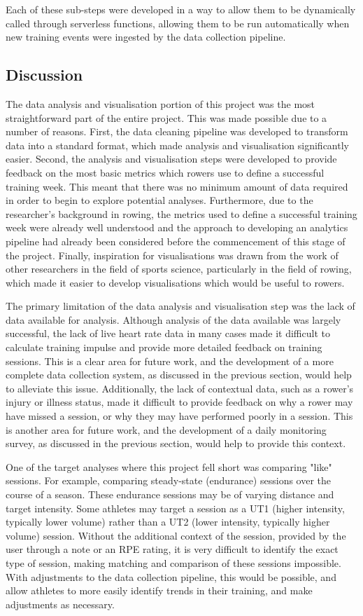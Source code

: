 Each of these sub-steps were developed in a way to allow them to be dynamically called through serverless functions, allowing them to be run automatically when new training events were ingested by the data collection pipeline.

\subsection{Discussion}
The data analysis and visualisation portion of this project was the most straightforward part of the entire project. This was made possible due to a number of reasons. First, the data cleaning pipeline was developed to transform data into a standard format, which made analysis and visualisation significantly easier. Second, the analysis and visualisation steps were developed to provide feedback on the most basic metrics which rowers use to define a successful training week. This meant that there was no minimum amount of data required in order to begin to explore potential analyses. Furthermore, due to the researcher's background in rowing, the metrics used to define a successful training week were already well understood and the approach to developing an analytics pipeline had already been considered before the commencement of this stage of the project. Finally, inspiration for visualisations was drawn from the work of other researchers in the field of sports science, particularly in the field of rowing, which made it easier to develop visualisations which would be useful to rowers.

The primary limitation of the data analysis and visualisation step was the lack of data available for analysis. Although analysis of the data available was largely successful, the lack of live heart rate data in many cases made it difficult to calculate training impulse and provide more detailed feedback on training sessions. This is a clear area for future work, and the development of a more complete data collection system, as discussed in the previous section, would help to alleviate this issue. Additionally, the lack of contextual data, such as a rower's injury or illness status, made it difficult to provide feedback on why a rower may have missed a session, or why they may have performed poorly in a session. This is another area for future work, and the development of a daily monitoring survey, as discussed in the previous section, would help to provide this context. 

One of the target analyses where this project fell short was comparing "like" sessions. For example, comparing steady-state (endurance) sessions over the course of a season. These endurance sessions may be of varying distance and target intensity. Some athletes may target a session as a UT1 (higher intensity, typically lower volume) rather than a UT2 (lower intensity, typically higher volume) session. Without the additional context of the session, provided by the user through a note or an RPE rating, it is very difficult to identify the exact type of session, making matching and comparison of these sessions impossible. With adjustments to the data collection pipeline, this would be possible, and allow athletes to more easily identify trends in their training, and make adjustments as necessary.

